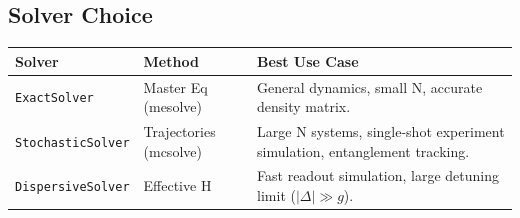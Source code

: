 \documentclass[11pt,a4paper]{article}
\theoremstyle{definition}
\begin{document}
\subsection{Solver Choice}
\begin{table}[h]
  \centering
  \begin{tabular}{llp{6cm}}
    \toprule
    \textbf{Solver} & \textbf{Method} & \textbf{Best Use Case} \\
    \midrule
    \texttt{ExactSolver} & Master Eq (mesolve) & General dynamics, small N, accurate density matrix. \\
    \texttt{StochasticSolver} & Trajectories (mcsolve) & Large N systems, single-shot experiment simulation, entanglement tracking. \\
    \texttt{DispersiveSolver} & Effective H & Fast readout simulation, large detuning limit ($|\Delta| \gg g$). \\
    \bottomrule
  \end{tabular}
\end{table}
\end{document}
